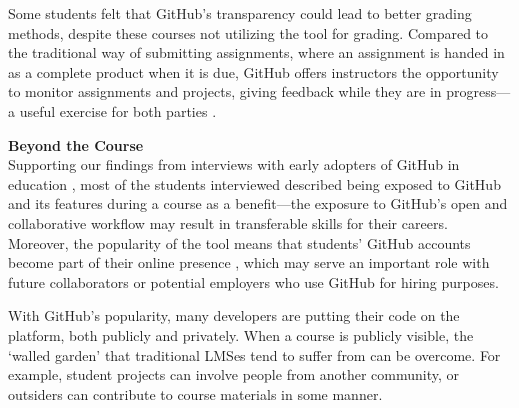 Some students felt that GitHub's transparency could lead to better grading methods, despite these courses not utilizing the tool for grading. Compared to the traditional way of submitting assignments, where an assignment is handed in as a complete product when it is due, GitHub offers instructors the opportunity to monitor assignments and projects, giving feedback while they are in progress---a useful exercise for both parties \cite{glassy2006using}.

\textbf{Beyond the Course} \\
Supporting our findings from interviews with early adopters of GitHub in education \cite{zagalsky2015emergence}, most of the students interviewed described being exposed to GitHub and its features during a course as a benefit---the exposure to GitHub's open and collaborative workflow may result in transferable skills for their careers. Moreover, the popularity of the tool means that students' GitHub accounts become part of their online presence \cite{marlow2013impression}, which may serve an important role with future collaborators or potential employers who use GitHub for hiring purposes.

With GitHub's popularity, many developers are putting their code on the platform, both publicly and privately. When a course is publicly visible, the `walled garden' that traditional LMSes tend to suffer from \cite{mott2010envisioning} can be overcome. For example, student projects can involve people from another community, or outsiders can contribute to course materials in some manner. \\

%
